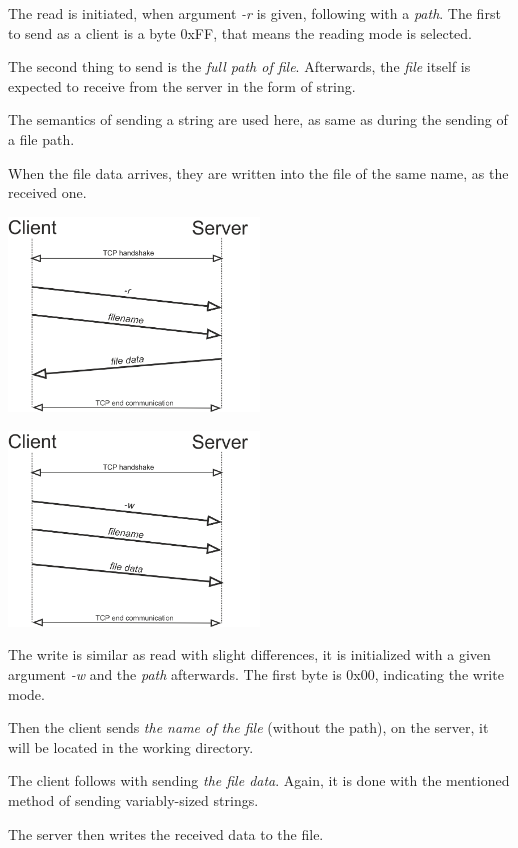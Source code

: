 \documentclass[10pt,a4paper,titlepage]{article}
\begin{document}
\begin{multicols}{2}
The read is initiated, when argument {\it -r} is given, following with
a {\it path}. The first to send as a client is a byte 0xFF, that means
the reading mode is selected.

The second thing to send is the {\it full path of file}. Afterwards, the {\it file}
itself is expected to receive from the server in the form of string.

The semantics of sending a string are used here, as same as during the sending
of a file path.

When the file data arrives, they are written into the file of the same name,
as the received one.

\includegraphics[width=0.5\textwidth]{read.png}
\end{multicols}


\begin{multicols}{2}
\includegraphics[width=0.5\textwidth]{write.png}

The write is similar as read with slight differences, it is initialized
with a given argument {\it -w} and the {\it path} afterwards. The first byte
is 0x00, indicating the write mode.

Then the client sends {\it the name of the file} (without the path), on the
server, it will be located in the working directory.

The client follows with sending {\it the file data}. Again, it is done
with the mentioned method of sending variably-sized strings.

The server then writes the received data to the file.

\end{multicols}
\end{document}
